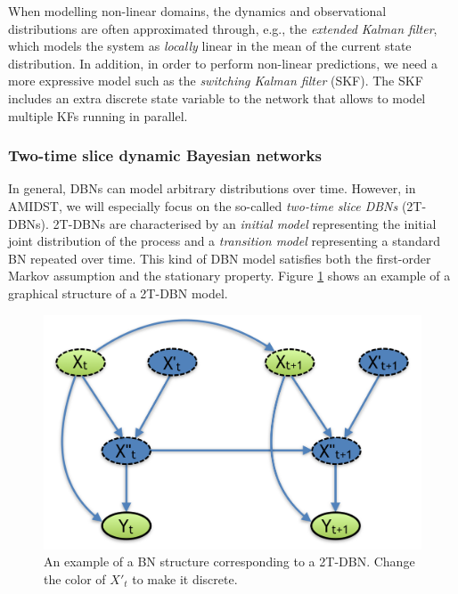 When modelling non-linear domains, the dynamics and observational distributions are often approximated through, e.g., the \textit{extended Kalman filter}, which models the system as \textit{locally} linear in the mean of the current state distribution. In addition, in order to perform non-linear predictions, we need a more expressive model such as the \textit{switching Kalman filter} (SKF). The SKF includes an extra discrete state variable to the network that allows to model multiple KFs running in parallel. 

\subsubsection{Two-time slice dynamic Bayesian networks}\label{SubSubSection:2DBNs}	

In general, DBNs can model arbitrary distributions over time. However, in AMIDST,  we will especially focus on the so-called \textit{two-time slice DBNs} (2T-DBNs). 2T-DBNs are characterised by an \textit{initial model} representing the initial joint distribution of the process and a \textit{transition model} representing a standard BN repeated over time. This kind of DBN model satisfies both the first-order Markov assumption and the stationary property. Figure \ref{Figure:DBN} shows an example of a graphical structure of a 2T-DBN model. 

\begin{figure}[ht!]
\begin{center}
\includegraphics[scale=0.45]{./figures/PreliminariesDBN}
\caption{\label{Figure:DBN}An example of a BN structure corresponding to a 2T-DBN. {\color{red} Change the color of $X'_t$ to make it discrete.}}
\end{center}
\end{figure}

